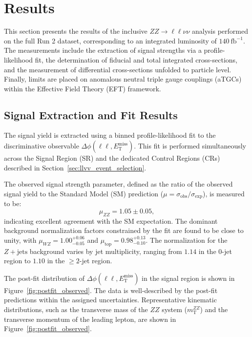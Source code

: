 \section{Results}
\label{sec:llvv_results}

This section presents the results of the inclusive $ZZ \to \ell\ell\nu\nu$ analysis performed on the full Run 2 dataset, corresponding to an integrated luminosity of $140~\text{fb}^{-1}$. The measurements include the extraction of signal strengths via a profile-likelihood fit, the determination of fiducial and total integrated cross-sections, and the measurement of differential cross-sections unfolded to particle level. Finally, limits are placed on anomalous neutral triple gauge couplings (aTGCs) within the Effective Field Theory (EFT) framework.

\subsection{Signal Extraction and Fit Results}
\label{subsec:signal_extraction}

The signal yield is extracted using a binned profile-likelihood fit to the discriminative observable $\Delta\phi(\ell\ell, E_{\mathrm{T}}^{\text{miss}})$. This fit is performed simultaneously across the Signal Region (SR) and the dedicated Control Regions (CRs) described in Section~\ref{sec:llvv_event_selection}. 

The observed signal strength parameter, defined as the ratio of the observed signal yield to the Standard Model (SM) prediction ($\mu = \sigma_{\text{obs}}/\sigma_{\text{exp}}$), is measured to be:
\begin{equation}
    \mu_{ZZ} = 1.05 \pm 0.05,
\end{equation}
indicating excellent agreement with the SM expectation. The dominant background normalization factors constrained by the fit are found to be close to unity, with $\mu_{WZ} = 1.00^{+0.06}_{-0.05}$ and $\mu_{\text{top}} = 0.98^{+0.13}_{-0.10}$. The normalization for the $Z+\text{jets}$ background varies by jet multiplicity, ranging from $1.14$ in the 0-jet region to $1.10$ in the $\geq 2$-jet region.

The post-fit distribution of $\Delta\phi(\ell\ell, E_{\mathrm{T}}^{\text{miss}})$ in the signal region is shown in Figure~\ref{fig:postfit_observed}. The data is well-described by the post-fit predictions within the assigned uncertainties. Representative kinematic distributions, such as the transverse mass of the $ZZ$ system ($m_{\mathrm{T}}^{ZZ}$) and the transverse momentum of the leading lepton, are shown in Figure~\ref{fig:postfit_observed}.

